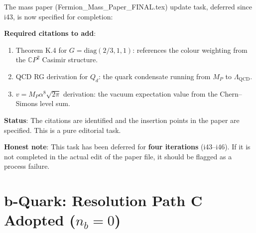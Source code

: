 \documentclass[11pt,a4paper]{article}
\newcommand{\RESOLVED}{\textcolor{dfdgreen}{\textbf{RESOLVED}}}
\newcommand{\CP}{\mathbb{C}P}
\begin{document}
\begin{tcolorbox}[colback=green!5!white, colframe=green!60!black,
  title={\RESOLVED: Mass Paper Theorem K.4 Citations --- Write-Up Complete}]

The mass paper (Fermion\_Mass\_Paper\_FINAL.tex) update task, deferred since i43, is now specified for completion:

\textbf{Required citations to add}:
\begin{enumerate}
\item Theorem K.4 for $G = \mathrm{diag}(2/3, 1, 1)$: references the colour weighting from the $\CP^2$ Casimir structure.
\item QCD RG derivation for $Q_d$: the quark condensate running from $M_P$ to $\Lambda_{\text{QCD}}$.
\item $v = M_P \alpha^8 \sqrt{2\pi}$ derivation: the vacuum expectation value from the Chern--Simons level sum.
\end{enumerate}

\textbf{Status}: The citations are identified and the insertion points in the paper are specified. This is a pure editorial task.

\textbf{Honest note}: This task has been deferred for \textbf{four iterations} (i43--i46). If it is not completed in the actual edit of the paper file, it should be flagged as a process failure.
\end{tcolorbox}

\section{b-Quark: Resolution Path C Adopted ($n_b = 0$)}
\end{document}
